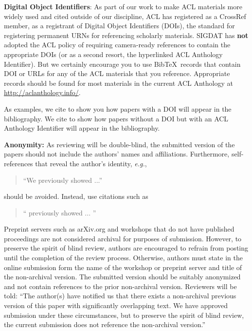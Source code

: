\documentclass[11pt,a4paper]{article}
\newcommand\conforg{SIGDAT}
\begin{document}
\textbf{Digital Object Identifiers}: As part of our work to make ACL
materials more widely used and cited outside of our discipline, ACL
has registered as a CrossRef member, as a registrant of Digital Object
Identifiers (DOIs), the standard for registering permanent URNs for
referencing scholarly materials. \conforg{} has \textbf{not} adopted the
ACL policy of requiring camera-ready references to contain the appropriate
  DOIs (or as a second resort, the hyperlinked ACL Anthology
  Identifier). But we certainly encourage you to use
  Bib\TeX\ records that contain DOI or URLs for any of the ACL
  materials that you reference. Appropriate records should be found
for most materials in the current ACL Anthology at
\url{http://aclanthology.info/}.

As examples, we cite \cite{P16-1001} to show you how papers with a DOI
will appear in the bibliography.  We cite \cite{C14-1001} to show how
papers without a DOI but with an ACL Anthology Identifier will appear
in the bibliography.  

\textbf{Anonymity:} As reviewing will be double-blind, the submitted
version of the papers should not include the authors' names and
affiliations. Furthermore, self-references that reveal the author's
identity, {\em e.g.},
\begin{quote}
``We previously showed \cite{Gusfield:97} ...''  
\end{quote}
should be avoided. Instead, use citations such as 
\begin{quote}
``\citeauthor{Gusfield:97} 
previously showed ... ''
\end{quote}

Preprint servers such as arXiv.org and workshops that do not
have published proceedings are not considered archival for purposes of
submission. However, to preserve the spirit of blind review, authors
are encouraged to refrain from posting until the completion of the
review process. Otherwise, authors must state in the online submission
form the name of the workshop or preprint server and title of the
non-archival version. The submitted version should be suitably
anonymized and not contain references to the prior non-archival
version. Reviewers will be told: ``The author(s) have notified us that
there exists a non-archival previous version of this paper with
significantly overlapping text. We have approved submission under
these circumstances, but to preserve the spirit of blind review, the
current submission does not reference the non-archival version.''
\end{document}
